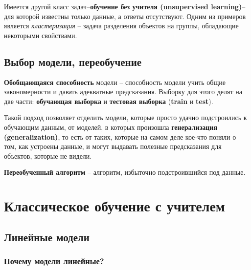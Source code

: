 \documentclass[a4paper, 10pt, openany]{book} %
\begin{document}
	Имеется другой класс задач--\textbf{обучение без учителя (unsupervised learning)}-- для которой известны только данные, а ответы отсутствуют. Одним из примеров является \textit{кластеризация} -- задача разделения объектов на группы, обладающие некоторыми свойствами.
	
	\section{Выбор модели, переобучение}
	
	\textbf{Обобщающаяся способность} модели -- способность модели учить общие закономерности и давать адекватные предсказания. Выборку для этого делят на две части: \textbf{обучающая выборка} и \textbf{тестовая выборка} (\textbf{train} и \textbf{test}). 
	
	Такой подход позволяет отделить модели, которые просто удачно подстроились к обучающим данным, от моделей, в которых произошла \textbf{генерализация (generalization)}, то есть от таких, которые на самом деле кое-что поняли о том, как устроены данные, и могут выдавать полезные предсказания для объектов, которые не видели.
	
	\textbf{Переобученный алгоритм} -- алгоритм, избыточно подстроившийся под данные.
	
	\chapter{Классическое обучение с учителем}
	
	\section{Линейные модели}
	
	\subsection{Почему модели линейные?}
	
\end{document}
